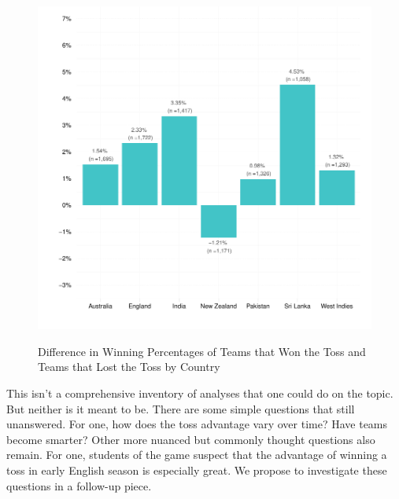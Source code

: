 \documentclass[12pt]{article}
\begin{document}
\begin{figure}[htbp]
\centering
\caption{Difference in Winning Percentages of Teams that Won the Toss and Teams that Lost the Toss by Country}
\includegraphics[scale=.85]{../figs/winbyCountry.pdf}
\label{fig:country}
\end{figure}

This isn't a comprehensive inventory of analyses that one could do on the topic. But neither is it meant to be. There are some simple questions that still unanswered. For one, how does the toss advantage vary over time? Have teams become smarter? Other more nuanced but commonly thought questions also remain. For one, students of the game suspect that the advantage of winning a toss in early English season is especially great. We propose to investigate these questions in a follow-up piece.

\clearpage


\end{document}
